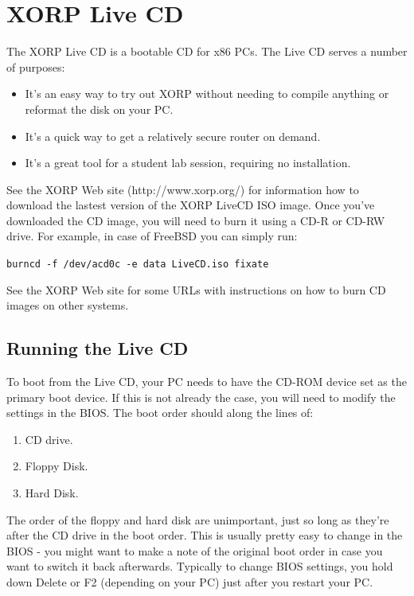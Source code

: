%
%

\chapter{XORP Live CD}
\label{livecd}

The XORP Live CD is a bootable CD for x86 PCs.
The Live CD serves a number of purposes:

\begin{itemize}

  \item It's an easy way to try out XORP without needing to
  compile anything or reformat the disk on your PC.
  \item It's a quick way to get a relatively secure router on demand.
  \item It's a great tool for a student lab session, requiring no
  installation.

\end{itemize}

See the XORP Web site ({\stt http://www.xorp.org/}) for information
how to download the lastest version of the XORP LiveCD ISO image.
Once you've downloaded the CD image, you will need to burn it using a
CD-R or CD-RW drive. For example, in case of FreeBSD you can simply run:

{\tt burncd -f /dev/acd0c -e data LiveCD.iso fixate}

See the XORP Web site for some URLs with instructions on how to burn CD images
on other systems.

\section{Running the Live CD}

To boot from the Live CD, your PC needs to have the CD-ROM device
set as the primary boot device.  If this is not already the case, you will
need to modify the settings in the BIOS.  The boot order should along the
lines of:

\begin{enumerate}
  \item CD drive.
  \item Floppy Disk.
  \item Hard Disk.
\end{enumerate}

The order of the floppy and hard disk are unimportant, just so
long as they're after the CD drive in the boot order.  This is usually
pretty easy to change in the BIOS - you might want to make a note of
the original boot order in case you want to switch it back afterwards.
Typically to change BIOS settings, you hold down Delete or F2
(depending on your PC) just after you restart your PC.

